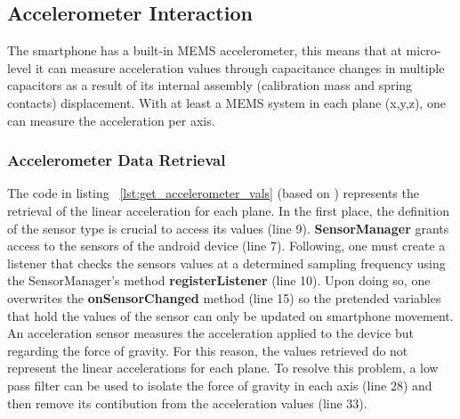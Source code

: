 \subsection{Accelerometer Interaction}%
\label{sec:accelerometer-access}
%
The smartphone has a built-in MEMS accelerometer, this means that at micro-level it can measure acceleration values through capacitance changes in multiple capacitors as a result of its internal assembly (calibration mass and spring contacts) displacement. With at least a MEMS system in each plane (x,y,z), one can measure the acceleration per axis. 
\subsubsection{Accelerometer Data Retrieval}
\label{sec:accelerometer-data}
%
The code in listing ~\ref{lst:get_accelerometer_vals} (based on \cite{androiddevsensors}) represents the retrieval of the linear acceleration for each plane.
In the first place, the definition of the sensor type is crucial to access its values (line 9). \textbf{SensorManager} grants access to the sensors of the android device (line 7). Following, one must create a listener that checks the sensors values at a determined sampling frequency using the SensorManager's method \textbf{registerListener} (line 10). Upon doing so, one overwrites the \textbf{onSensorChanged} method (line 15) so the pretended variables that hold the values of the sensor can only be updated on smartphone movement.
An acceleration sensor measures the acceleration applied to the device but regarding the force of gravity. For this reason, the values retrieved do not represent the linear accelerations for each plane. To resolve this problem, a low pass filter can be used to isolate the force of gravity in each axis (line 28) and then remove its contibution from the acceleration values (line 33).\\
%

%
